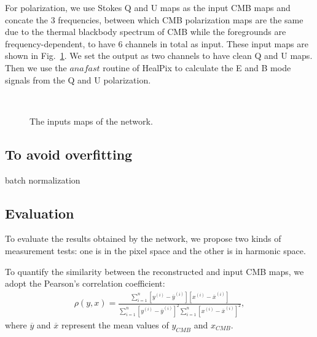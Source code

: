 \documentclass[floatfix]{emulateapj}
\begin{document}
For polarization, we use Stokes Q and U maps as the input CMB maps and concate the 3 frequencies, between which CMB polarization maps are the same due to the thermal blackbody spectrum of CMB while the foregrounds are frequency-dependent, to have 6 channels in total as input. These input maps are shown in Fig.~\ref{fig:input_maps}. We set the output as two channels to have clean Q and U maps. Then we use the $anafast$ routine of HealPix \citep{2005ApJ...622..759G} to calculate the E and B mode signals from the Q and U polarization. 

\begin{figure}[htpb]
\centering
\mbox{
}
	
\caption{The inputs maps of the network.}
\label{fig:input_maps}
\end{figure}

\subsection{To avoid overfitting}
batch normalization 
\subsection{Evaluation}
To evaluate the results obtained by the network, we propose two kinds of measurement tests: one is in the pixel space and the other is in harmonic space.
 
To quantify the similarity between the reconstructed and input CMB maps, we adopt the Pearson's correlation coefficient:  
\begin{align}
\rho(y,x) = \frac{\sum_{i=1}^{n} [y^{(i)} - \overline{y}^{(i)}][x^{(i)} - \overline{x}^{(i)}]}{\sum_{i=1}^{n}[y^{(i)} - \overline{y}^{(i)}]^2 \sum_{i=1}^{n}[x^{(i)} - \overline{x}^{(i)}]^2},
\end{align}
where $\overline{y}$ and $\overline{x}$ represent the mean values of $y_{CMB}$ and $x_{CMB}$.
\end{document}
